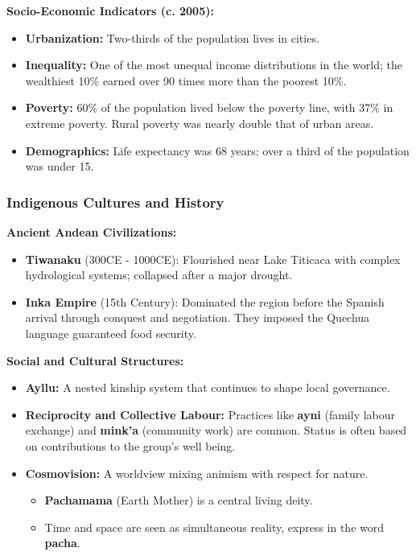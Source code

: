 \documentclass{article}
\begin{document}
    \noindent \textbf{Socio-Economic Indicators (c. 2005):}
    \begin{itemize}
        \item \textbf{Urbanization:} Two-thirds of the population lives in
        cities.
        \item \textbf{Inequality:} One of the most unequal income
        distributions in the world; the wealthiest 10\% earned over 90 times
        more than the poorest 10\%.
        \item \textbf{Poverty:} 60\% of the population lived below the
        poverty line, with 37\% in extreme poverty. Rural poverty was nearly
        double that of urban areas.
        \item \textbf{Demographics:} Life expectancy was 68 years; over a
        third of the population was under 15.
    \end{itemize}

    \subsubsection{Indigenous Cultures and History}

    \noindent \textbf{Ancient Andean Civilizations:}
    \begin{itemize}
        \item \textbf{Tiwanaku} (300CE - 1000CE): Flourished near Lake
        Titicaca with complex hydrological systems; collapsed after a major
        drought.
        \item \textbf{Inka Empire} (15th Century): Dominated the region
        before the Spanish arrival through conquest and negotiation. They
        imposed the Quechua language guaranteed food security.
    \end{itemize}

    \noindent \textbf{Social and Cultural Structures:}
    \begin{itemize}
        \item \textbf{Ayllu:} A nested kinship system that continues to
        shape local governance.
        \item \textbf{Reciprocity and Collective Labour:} Practices like \textbf{ayni} (family labour exchange) and \textbf{mink'a} (community work) are common. Status is often based on contributions to the group's well being.
        \item \textbf{Cosmovision:} A worldview mixing animism with respect
        for nature.
        \begin{itemize}
            \item \textbf{Pachamama} (Earth Mother) is a central living deity.
            \item Time and space are seen as simultaneous reality, express
            in the word \textbf{pacha}.
        \end{itemize}
    \end{itemize}
\end{document}
